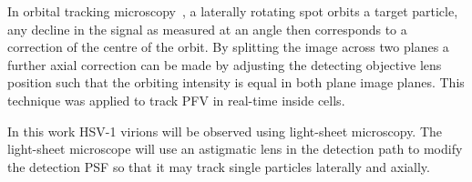 In orbital tracking microscopy~\cite{dupontNanoscaleThreedimensionalSingle2011}, a laterally rotating spot orbits a target particle, any decline in the signal as measured at an angle then corresponds to a correction of the centre of the orbit.
By splitting the image across two planes a further axial correction can be made by adjusting the detecting objective lens position such that the orbiting intensity is equal in both plane image planes.
This technique was applied to track \gls{PFV} in real-time inside cells.

In this work \gls{HSV}-1 virions will be observed using \gls{light-sheet} microscopy.
The \gls{light-sheet} microscope will use an astigmatic lens in the detection path to modify the detection \gls{PSF} so that it may track single particles laterally and axially.



